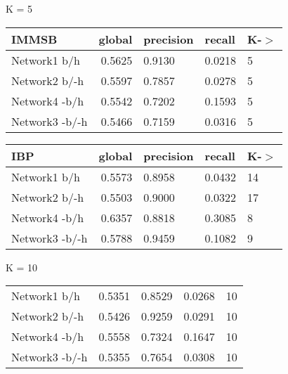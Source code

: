 \begin{table*}[h] \label{table:balanced}
\caption{Predictive Performance on a Balanced Testing set}
	\begin{minipage}[h]{0.45\linewidth} 
K =  5\hspace{5pt}
\begin{tabular}{lrlll}
\hline
 IMMSB   &   global &   precision &   recall &    K-\ensuremath{>} \\
\hline
 Network1 b/h           &   0.5625 &      0.9130 &   0.0218 & 5 \\
 Network2 b/-h        &   0.5597 &      0.7857 &   0.0278 & 5 \\
 Network4 -b/h         &   0.5542 &      0.7202 &   0.1593 & 5 \\
 Network3 -b/-h       &   0.5466 &      0.7159 &   0.0316 & 5 \\
\hline
\end{tabular}
\end{minipage}
\hspace{0.5cm}
\begin{minipage}[h]{0.45\linewidth}
\begin{tabular}{lrlll}
\hline
 IBP   &   global &   precision &   recall &     K-\ensuremath{>} \\
\hline
 Network1 b/h         &   0.5573 &      0.8958 &   0.0432 & 14 \\
 Network2 b/-h      &   0.5503 &      0.9000 &   0.0322 & 17 \\
 Network4 -b/h       &   0.6357 &      0.8818 &   0.3085 &  8 \\
 Network3 -b/-h     &   0.5788 &      0.9459 &   0.1082 &  9 \\
\hline
\end{tabular}
\end{minipage}


	\begin{minipage}[h]{0.45\linewidth} 
K = 10
\begin{tabular}{lrrrr}
 Network1 b/h           &   0.5351 &      0.8529 &   0.0268 & 10 \\
 Network2 b/-h        &   0.5426 &      0.9259 &   0.0291 & 10 \\
 Network4 -b/h         &   0.5558 &      0.7324 &   0.1647 & 10 \\
 Network3 -b/-h       &   0.5355 &      0.7654 &   0.0308 & 10 \\
\hline
\end{tabular}
\end{minipage}
\hspace{0.5cm}
\begin{minipage}[h]{0.45\linewidth}
\begin{tabular}{lrrrr}


\end{tabular}
\end{minipage}
\end{table*}
